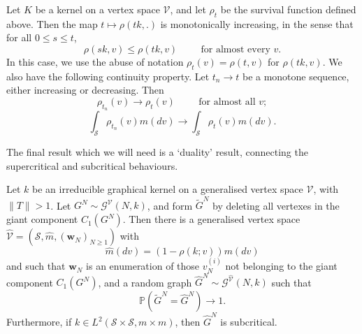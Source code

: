    \begin{theorem}\label{thrm: continuity of rho} Let $K$ be a kernel on a vertex space $\mathcal{V}$, and let $\rho_t$ be the survival function defined above. Then the map $t\mapsto \rho(tk, .)$ is monotonically increasing, in the sense that for all $0\leq s \leq t$, \begin{equation}
          \rho(sk, v) \leq \rho(tk, v) \hspace{1cm} \text{for almost every } v.
      \end{equation}In this case, we use the abuse of notation $\rho_t(v)=\rho(t,v)$ for $\rho(tk,v).$ We also have the following continuity property. Let $t_n\rightarrow t$ be a monotone sequence, either increasing or decreasing. Then \begin{equation}
       \rho_{t_n}(v)\rightarrow \rho_t(v) \hspace{1cm} \text{for almost all }v;
   \end{equation} \begin{equation}
       \int_{\mathcal{S}}\rho_{t_n}(v)m(dv)\rightarrow \int_{\mathcal{S}}\rho_t(v)m(dv).
   \end{equation} \end{theorem} The final result which we will need is a `duality' result, connecting the supercritical and subcritical behaviours.
   \begin{theorem}\label{thrm: coupling supercritical and subcritical} Let $k$ be an irreducible graphical kernel on a generalised vertex space $\mathcal{V}$, with $\|T\|>1$. Let $G^N \sim \mathcal{G}^\mathcal{V}(N, k)$, and form $\widetilde{G}^N$ by deleting all vertexes in the giant component $C_1(G^N).$ Then there is a generalised vertex space $\widehat{\mathcal{V}}=(\mathcal{S}, \widehat{m}, (\mathbf{w}_N)_{N\geq 1})$ with \begin{equation}
       \widehat{m}(dv)=(1-\rho(k;v))m(dv)
   \end{equation} and such that $\mathbf{w}_N$ is an enumeration of those $v^{(i)}_N$ not belonging to the giant component $C_1(G^N)$, and a random graph $\widehat{G}^N \sim \mathcal{G}^{\widehat{\mathcal{V}}}(N,k)$ such that \begin{equation}
       \mathbb{P}(\widetilde{G}^N=\widehat{G}^N)\rightarrow 1.
   \end{equation}  Furthermore, if $k\in L^2(\mathcal{S}\times \mathcal{S}, m\times m)$, then $\widehat{G}^N$ is subcritical.\end{theorem} 